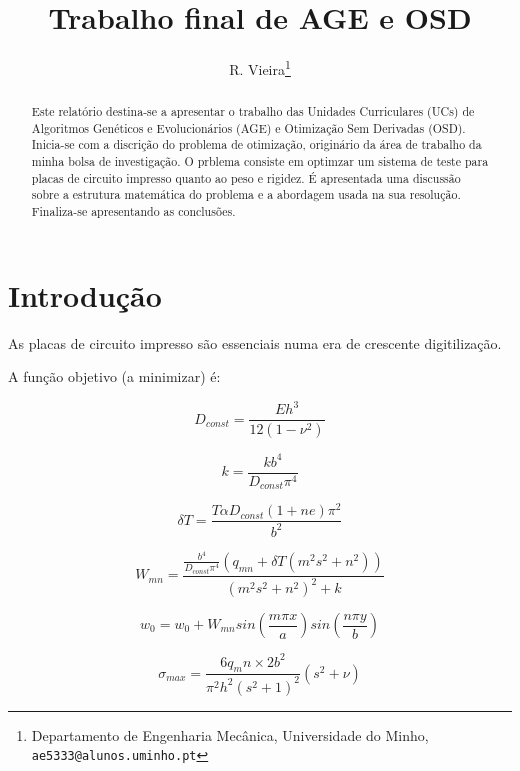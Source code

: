 \documentclass[a4paper,12pt]{article}
\begin{document}
%
\title{Trabalho final de AGE e OSD}


\author{R. Vieira\thanks{Departamento de Engenharia Mecânica, Universidade do Minho, {\tt ae5333@alunos.uminho.pt}}}

\maketitle              %

\begin{abstract}
Este relatório destina-se a apresentar o trabalho das Unidades Curriculares (UCs) de Algoritmos Genéticos e Evolucionários (AGE) e Otimização Sem Derivadas (OSD). Inicia-se com a discrição do problema de otimização, originário da área de trabalho da minha bolsa de investigação. O prblema consiste em optimzar um sistema de teste para placas de circuito impresso quanto ao peso e rigidez. É apresentada uma discussão sobre a estrutura matemática do problema e a abordagem usada na sua resolução. Finaliza-se apresentando as conclusões.
\end{abstract}

\section{Introdução}

As placas de circuito impresso são essenciais numa era de crescente digitilização.

A função objetivo (a minimizar) é:


\begin{equation}\label{eq:fo}
D_{const}=\frac{E h^3}{12\left(1-{\nu}^2\right)}
\end{equation}

\begin{equation}\label{eq:fo}
k=\frac{k b^4}{D_{const} {\pi}^4}
\end{equation}

\begin{equation}\label{eq:fo}
\delta T=\frac{T \alpha D_{const} \left(1+ne\right) {\pi}^2}{b^2}
\end{equation}

\begin{equation}\label{eq:fo}
W_{mn}=\frac{\frac{b^4}{D_{const} {\pi}^4} \left(q_{mn}+\delta T \left(m^2 s^2+n^2\right)\right)}{{\left(m^2 s^2+n^2\right)}^2+k}
\end{equation}

\begin{equation}\label{eq:fo}
w_0=w_0+W_{mn} sin\left(\frac{m \pi x}{a}\right) sin\left(\frac{n \pi y}{b}\right)
\end{equation}

\begin{equation}\label{eq:fo}
\sigma_{max}=\frac{6q_mn\times2 b^2}{{\pi}^2 h^2 {\left(s^2+1\right)}^2} \left(s^2+\nu\right)
\end{equation}
\end{document}
